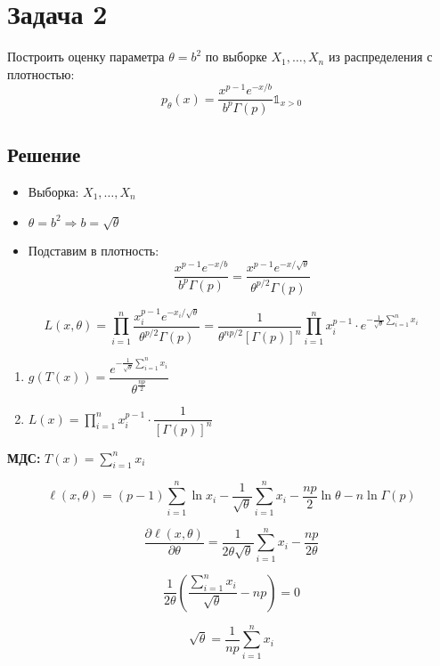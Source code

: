 \documentclass[areasetadvanced]{scrartcl}
\begin{document}
\section{Задача 2}
Построить оценку параметра $ \theta = b^2$ по выборке $X_1, \dots, X_n$ из распределения с плотностью:
\[
p_\theta(x) = \frac{x^{p-1} e^{-x/b}}{b^{p}\Gamma(p)}\mathds{1}_{x > 0}
\]

\subsection{Решение}

\begin{itemize}
    \item Выборка: $X_1, \dots, X_n$
    \item $\theta = b^2 \Rightarrow b = \sqrt{\theta}$
    \item Подставим в плотность: 
    \[
    \frac{x^{p-1}e^{-x/b}}{b^p \Gamma(p)} = \frac{x^{p-1}e^{-x/\sqrt{\theta}}}{\theta^{p/2} \Gamma(p)}
    \]
\end{itemize}

\[
L(x,\theta) = \prod_{i=1}^{n} \frac{x_{i}^{p-1} e^{-x_i/\sqrt{\theta}}}{\theta^{p/2} \Gamma(p)}
= \frac{1}{\theta^{np/2} [\Gamma(p)]^n} \prod_{i=1}^{n} x_i^{p-1} \cdot e^{-\frac{1}{\sqrt{\theta}} \sum_{i=1}^{n} x_i}
\]
\begin{enumerate}
    \item \( g(T(x)) = \dfrac{e^{-\frac{1}{\sqrt{\theta}} \sum\limits_{i=1}^{n} x_i}}{\theta^{\frac{np}{2}}} \)
    
    \item \( L(x) = \prod\limits_{i=1}^{n} x_i^{p-1} \cdot \dfrac{1}{[\Gamma(p)]^n} \)
\end{enumerate}

\textbf{МДС:} \( T(x) = \sum\limits_{i=1}^{n} x_i \)

\[
\ell(x, \theta) = (p - 1) \sum_{i=1}^{n} \ln x_i - \frac{1}{\sqrt{\theta}} \sum_{i=1}^{n} x_i - \frac{np}{2} \ln \theta - n \ln \Gamma(p)
\]

\vspace{1em}

\[
\frac{\partial \ell(x, \theta)}{\partial \theta} = \frac{1}{2 \theta \sqrt{\theta}} \sum_{i=1}^{n} x_i - \frac{np}{2\theta}
\]

\[
\frac{1}{2\theta} \left( \frac{\sum\limits_{i=1}^{n} x_i}{\sqrt{\theta}} - np \right) = 0
\]

\[
\sqrt{\theta} = \frac{1}{np} \sum_{i=1}^{n} x_i 
\]
\end{document}
